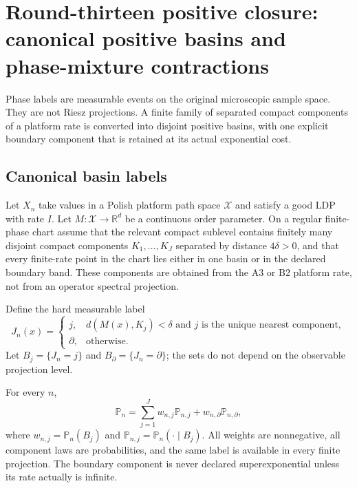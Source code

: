 \section{Round-thirteen positive closure: canonical positive basins and phase-mixture contractions}
\label{sec:r13-d1}

Phase labels are measurable events on the original microscopic sample space.
They are not Riesz projections.  A finite family of separated compact
components of a platform rate is converted into disjoint positive basins, with
one explicit boundary component that is retained at its actual exponential
cost.

\subsection{Canonical basin labels}

Let $X_n$ take values in a Polish platform path space $\mathcal X$ and satisfy
a good LDP with rate $I$.  Let
$M:\mathcal X\to\mathbb R^d$ be a continuous order parameter.  On a regular
finite-phase chart assume that the relevant compact sublevel contains finitely
many disjoint compact components
$K_1,\ldots,K_J$ separated by distance $4\delta>0$, and that every finite-rate
point in the chart lies either in one basin or in the declared boundary band.
These components are obtained from the A3 or B2 platform rate, not from an
operator spectral projection.

Define the hard measurable label
\[
 J_n(x)=
 \begin{cases}
 j,&d(M(x),K_j)<\delta
     \text{ and }j\text{ is the unique nearest component},\\
 \partial,&\text{otherwise}.
 \end{cases}
\]
Let $B_j=\{J_n=j\}$ and $B_\partial=\{J_n=\partial\}$; the sets do
not depend on the observable projection level.

\begin{theorem}
\label{thm:r13-d1-disintegration}
For every $n$,
\[
 \mathbb P_n=
 \sum_{j=1}^Jw_{n,j}\mathbb P_{n,j}
 +w_{n,\partial}\mathbb P_{n,\partial},
\]
where $w_{n,j}=\mathbb P_n(B_j)$ and
$\mathbb P_{n,j}=\mathbb P_n(\cdot\mid B_j)$.  All weights are nonnegative,
all component laws are probabilities, and the same label is available in
every finite projection.  The boundary component is never declared
superexponential unless its rate actually is infinite.
\end{theorem}


